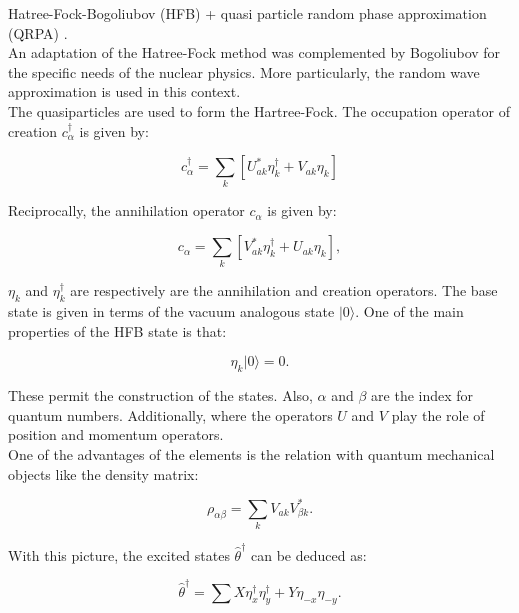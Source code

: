 \documentclass[openany]{book}
\begin{document}
Hatree-Fock-Bogoliubov (HFB) + quasi particle random phase approximation (QRPA) \cite{chimanski_in_escher_peru_younes_2022}. \\

An adaptation of the Hatree-Fock method was complemented by Bogoliubov for the specific needs of the nuclear physics. More particularly, the random wave approximation is used in this context.  \\

The quasiparticles are used to form the Hartree-Fock. The occupation operator of creation $c^{\dagger}_\alpha$ is given by:

\begin{equation}\label{eq:micro_HFB_creation}
	c^{\dagger}_\alpha = \sum_{k} [U^{*}_{ak} \eta^{\dagger}_k + V_{ak} \eta_k]
\end{equation}

Reciprocally, the annihilation operator $c_\alpha$ is given by: 


\begin{equation}\label{eq:micro_HFB_annihilation}
	c_\alpha = \sum_{k} [V^{*}_{ak} \eta^{\dagger}_k + U_{ak} \eta_k],
\end{equation}

$\eta_k$ and  $\eta^{\dagger}_k $ are respectively are the annihilation and creation operators.  The base state is given in terms of the vacuum analogous state $| 0 \rangle$. One of the main properties of the HFB state is that: 

\begin{equation}\label{eq:micro_HFB_base}
	\eta_k |0\rangle = 0.
\end{equation} 

These permit the construction of the states. Also, $\alpha$ and $\beta$ are the index for quantum numbers. Additionally, where the operators $U$ and $V$ play the role of position and momentum operators. \\

One of the advantages of the elements is the relation with quantum mechanical objects like the density matrix: 

\begin{equation}\label{eq:micro_HFB_densityMatrix}
	\rho_{\alpha \beta} = \sum_k {V_{ak}V^{*}_{\beta k}}.
\end{equation}

With this picture, the excited states ${\hat {\theta}}^{\dagger}$ can be deduced as:

\begin{equation}\label{eq:micro_QHFB_excited}
	{\hat {\theta}}^{\dagger} = \sum X \eta^\dagger_x \eta^\dagger_y   + Y \eta_{-x} \eta_{-y}.
\end{equation}
\end{document}
